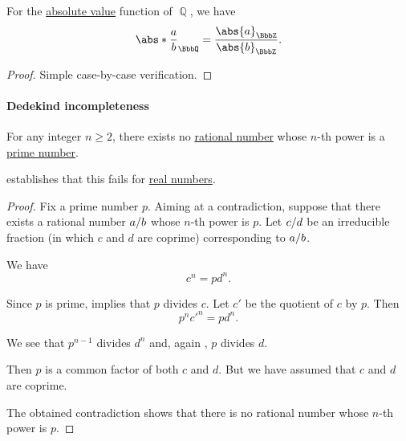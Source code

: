 \begin{proposition}\label{thm:rational_number_absolute_value}\mimprovised
  For the \hyperref[def:totally_ordered_ring_absolute_value]{absolute value} function of \( \BbbQ \), we have
  \begin{equation*}
    \abs*{ \frac a b }_\BbbQ = \frac {\abs{a}_\BbbZ} {\abs{b}_\BbbZ}.
  \end{equation*}
\end{proposition}
\begin{proof}
  Simple case-by-case verification.
\end{proof}

\paragraph{Dedekind incompleteness}

\begin{proposition}\label{thm:nth_root_is_not_rational}
  For any integer \( n \geq 2 \), there exists no \hyperref[def:rational_numbers]{rational number} whose \( n \)-th power is a \hyperref[def:prime_number]{prime number}.
\end{proposition}
\begin{comments}
  \item {} establishes that this fails for \hyperref[def:real_numbers]{real numbers}.
\end{comments}
\begin{proof}
  Fix a prime number \( p \). Aiming at a contradiction, suppose that there exists a rational number \( \ifrac a b \) whose \( n \)-th power is \( p \). Let \( \ifrac c d \) be an irreducible fraction (in which \( c \) and \( d \) are coprime) corresponding to \( \ifrac a b \).

  We have
  \begin{equation*}
    c^n = p d^n.
  \end{equation*}

  Since \( p \) is prime,  implies that \( p \) divides \( c \). Let \( c' \) be the quotient of \( c \) by \( p \). Then
  \begin{equation*}
    p^n c'^n = p d^n.
  \end{equation*}

  We see that \( p^{n-1} \) divides \( d^n \) and, again , \( p \) divides \( d \).

  Then \( p \) is a common factor of both \( c \) and \( d \). But we have assumed that \( c \) and \( d \) are coprime.

  The obtained contradiction shows that there is no rational number whose \( n \)-th power is \( p \).
\end{proof}


